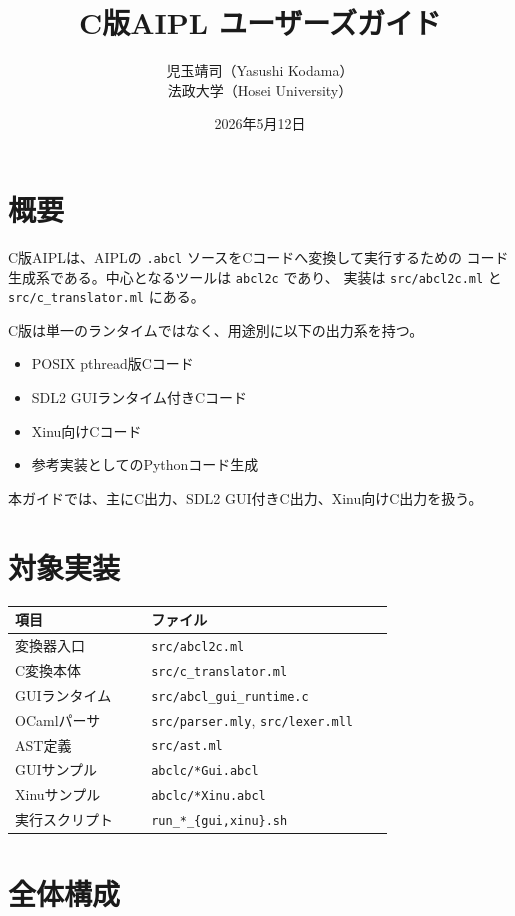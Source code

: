 \documentclass[11pt,a4paper,uplatex,dvipdfmx]{jsarticle}
\title{C版AIPL ユーザーズガイド}
\author{児玉靖司（Yasushi Kodama）\\法政大学（Hosei University）}
\date{2026年5月12日}
\begin{document}
\maketitle
\tableofcontents
\newpage

\section{概要}

C版AIPLは、AIPLの \texttt{.abcl} ソースをCコードへ変換して実行するための
コード生成系である。中心となるツールは \texttt{abcl2c} であり、
実装は \texttt{src/abcl2c.ml} と \texttt{src/c\_translator.ml} にある。

C版は単一のランタイムではなく、用途別に以下の出力系を持つ。

\begin{itemize}
  \item POSIX pthread版Cコード
  \item SDL2 GUIランタイム付きCコード
  \item Xinu向けCコード
  \item 参考実装としてのPythonコード生成
\end{itemize}

本ガイドでは、主にC出力、SDL2 GUI付きC出力、Xinu向けC出力を扱う。

\section{対象実装}

\begin{longtable}{p{0.32\linewidth}p{0.58\linewidth}}
\toprule
項目 & ファイル \\
\midrule
変換器入口 & \texttt{src/abcl2c.ml} \\
C変換本体 & \texttt{src/c\_translator.ml} \\
GUIランタイム & \texttt{src/abcl\_gui\_runtime.c} \\
OCamlパーサ & \texttt{src/parser.mly}, \texttt{src/lexer.mll} \\
AST定義 & \texttt{src/ast.ml} \\
GUIサンプル & \texttt{abclc/*Gui.abcl} \\
Xinuサンプル & \texttt{abclc/*Xinu.abcl} \\
実行スクリプト & \texttt{run\_*\_\{gui,xinu\}.sh} \\
\bottomrule
\end{longtable}

\section{全体構成}
\end{document}
